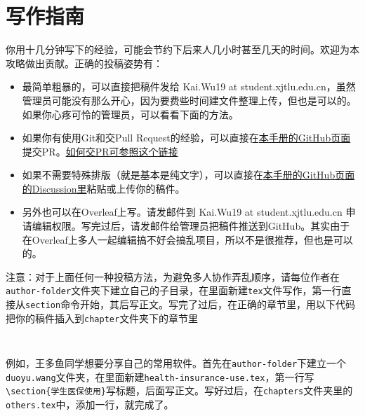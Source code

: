 \chapter{写作指南}
\label{chapter.author-ins}


你用十几分钟写下的经验，可能会节约下后来人几小时甚至几天的时间。欢迎为本攻略做出贡献。正确的投稿姿势有：

\begin{itemize}
    \item 最简单粗暴的，可以直接把稿件发给 Kai.Wu19 at student.xjtlu.edu.cn，虽然管理员可能没有那么开心，因为要费些时间建文件整理上传，但也是可以的。如果你心疼可怜的管理员，可以看看下面的方法。
    \item 如果你有使用Git和交Pull Request的经验，可以直接在\href{https://github.com/kaiwu-astro/xp_pgrs_unofficial_guide}{本手册的GitHub页面}提交PR。\href{https://www.zhihu.com/question/21682976/answer/79489643}{如何交PR可参照这个链接}
    \item 如果不需要特殊排版（就是基本是纯文字），可以直接在\href{https://github.com/kaiwu-astro/xp_pgrs_unofficial_guide/discussions}{本手册的GitHub页面的Discussion里}粘贴或上传你的稿件。
    \item 另外也可以在Overleaf上写。请发邮件到 Kai.Wu19 at student.xjtlu.edu.cn 申请编辑权限。写完过后，请发邮件给管理员把稿件推送到GitHub。其实由于在Overleaf上多人一起编辑搞不好会搞乱项目，所以不是很推荐，但也是可以的。
\end{itemize} 

\vspace{5mm}
注意：对于上面任何一种投稿方法，为避免多人协作弄乱顺序，请每位作者在\texttt{author-folder}文件夹下建立自己的子目录，在里面新建\texttt{tex}文件写作，第一行直接从\texttt{section}命令开始，其后写正文。写完了过后，在正确的章节里，用以下代码把你的稿件插入到\texttt{chapter}文件夹下的章节里
\begin{lstlisting}
    
\end{lstlisting} 
例如，王多鱼同学想要分享自己的常用软件。首先在\texttt{author-folder}下建立一个\texttt{duoyu.wang}文件夹，在里面新建\texttt{health-insurance-use.tex}，第一行写\lstinline[breaklines=true]!\section{学生医保使用}!写标题，后面写正文。写好过后，在\texttt{chapters}文件夹里的\texttt{others.tex}中，添加一行\lstinline[breaklines=true]!!，就完成了。

